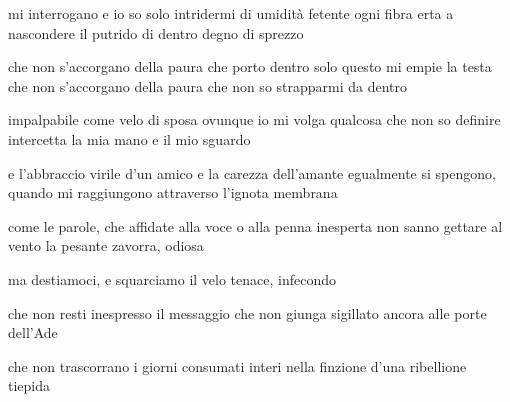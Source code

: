 \begin{volumetitlepage}
\end{volumetitlepage}


\begin{poem}
	\begin{stanza}
		mi interrogano\verseline
		e io so solo intridermi\verseline
		di umidità fetente\verseline
		ogni fibra erta a nascondere\verseline
		il putrido di dentro\verseline
		degno di sprezzo
	\end{stanza}

	\begin{stanza}
		che non s’accorgano della paura\verseline
		che porto dentro\verseline
		solo questo mi empie la testa\verseline
		che non s’accorgano della paura\verseline
		che non so strapparmi da dentro
	\end{stanza}
\end{poem}

\clearpage


\begin{poem}
	\begin{stanza}
		impalpabile come velo di sposa\verseline
		ovunque io mi volga\verseline
		qualcosa che non so definire\verseline
		intercetta la mia mano e il mio sguardo
	\end{stanza}

	\begin{stanza}
		e l'abbraccio virile d'un amico\verseline
		e la carezza dell'amante\verseline
		egualmente si spengono, quando mi raggiungono\verseline
		attraverso l'ignota membrana
	\end{stanza}

	\begin{stanza}
		come le parole, che affidate alla voce\verseline
		o alla penna inesperta\verseline
		non sanno gettare al vento\verseline
		la pesante zavorra, odiosa
	\end{stanza}

	\begin{stanza}
		ma destiamoci, e squarciamo\verseline
		il velo tenace, infecondo
	\end{stanza}

	\begin{stanza}
		che non resti inespresso il messaggio\verseline
		che non giunga sigillato ancora\verseline
		alle porte dell'Ade
	\end{stanza}

	\begin{stanza}
		che non trascorrano i giorni\verseline
		consumati interi nella finzione\verseline
		d'una ribellione tiepida
	\end{stanza}
\end{poem}


